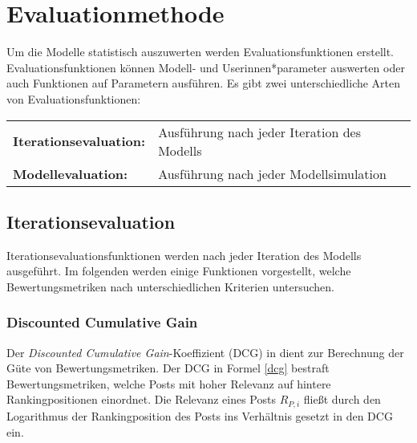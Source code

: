 \chapter{Evaluationmethode}
\label{chap:evaluationsmethode}

Um die Modelle statistisch auszuwerten werden Evaluationsfunktionen erstellt. Evaluationsfunktionen können Modell-  und Userinnen*parameter auswerten oder auch Funktionen auf Parametern ausführen.
Es gibt zwei unterschiedliche Arten von Evaluationsfunktionen:

\begin{table}[!htbp]
	\begin{tabularx}{\textwidth}{lX}
		\textbf{Iterationsevaluation:} &  Ausführung nach jeder Iteration des Modells\\
		\textbf{Modellevaluation:} & Ausführung nach jeder Modellsimulation  \\
	\end{tabularx}
\end{table}

\section{Iterationsevaluation}
\label{sec:evaluationsfunktionen}

Iterationsevaluationsfunktionen werden nach jeder Iteration des Modells ausgeführt. Im folgenden werden einige Funktionen vorgestellt, welche Bewertungsmetriken nach unterschiedlichen Kriterien untersuchen.



\subsection{Discounted Cumulative Gain}

Der \textit{Discounted Cumulative Gain}-Koeffizient (DCG) in \cite{Biega2018405} dient zur Berechnung der Güte von Bewertungsmetriken. Der DCG in Formel \ref{dcg} bestraft Bewertungsmetriken, welche Posts mit hoher Relevanz auf hintere Rankingpositionen einordnet. Die Relevanz eines Posts $R_{P,i}$ fließt durch den Logarithmus der Rankingposition des Posts ins Verhältnis gesetzt in den DCG ein.

